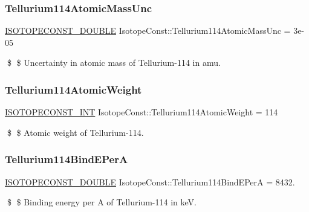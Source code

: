 \subsubsection{\texorpdfstring{Tellurium114\+Atomic\+Mass\+Unc}{Tellurium114AtomicMassUnc}}
{\footnotesize\ttfamily \mbox{\hyperlink{group___isotope_const-_macros_ga8f45a7272ce02c0b4c65c44636ed719a}{I\+S\+O\+T\+O\+P\+E\+C\+O\+N\+S\+T\+\_\+\+D\+O\+U\+B\+LE}} Isotope\+Const\+::\+Tellurium114\+Atomic\+Mass\+Unc = 3e-\/05}

\$ \$ Uncertainty in atomic mass of Tellurium-\/114 in amu. \mbox{\label{group___isotope_const-_tellurium-_te114_ga6b7bceee64265b56cb0777b5911e55e6}} 
\subsubsection{\texorpdfstring{Tellurium114\+Atomic\+Weight}{Tellurium114AtomicWeight}}
{\footnotesize\ttfamily \mbox{\hyperlink{group___isotope_const-_macros_ga5f18360b3e99483a35c32d789e62621c}{I\+S\+O\+T\+O\+P\+E\+C\+O\+N\+S\+T\+\_\+\+I\+NT}} Isotope\+Const\+::\+Tellurium114\+Atomic\+Weight = 114}

\$ \$ Atomic weight of Tellurium-\/114. \mbox{\label{group___isotope_const-_tellurium-_te114_ga27e07428d94e63168ab3ed2f3d359b46}} 
\subsubsection{\texorpdfstring{Tellurium114\+Bind\+E\+PerA}{Tellurium114BindEPerA}}
{\footnotesize\ttfamily \mbox{\hyperlink{group___isotope_const-_macros_ga8f45a7272ce02c0b4c65c44636ed719a}{I\+S\+O\+T\+O\+P\+E\+C\+O\+N\+S\+T\+\_\+\+D\+O\+U\+B\+LE}} Isotope\+Const\+::\+Tellurium114\+Bind\+E\+PerA = 8432.}

\$ \$ Binding energy per A of Tellurium-\/114 in keV. \mbox{\label{group___isotope_const-_tellurium-_te114_gae8e8290fdd67ac446476345c5c36b31e}} 
